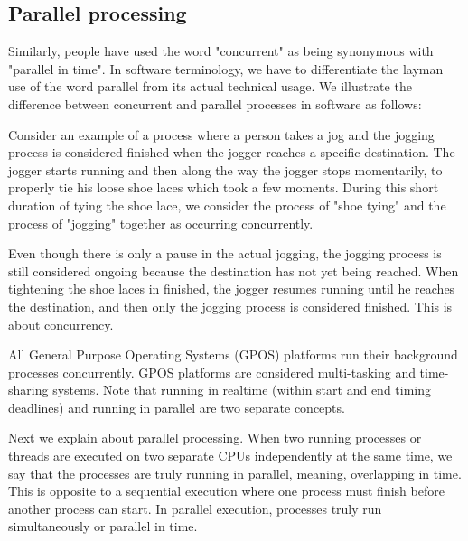 \subsection{Parallel processing}

Similarly, people have used the word "concurrent" as being synonymous with "parallel in time". In software terminology, we have to differentiate the layman use of the word parallel from its actual technical usage. We illustrate the difference between concurrent and parallel processes in software as follows: 
\vspace*{1\baselineskip}

Consider an example of a process where a person takes a jog and the jogging process is considered finished when the jogger reaches a specific destination. The jogger starts running and then along the way the jogger stops momentarily, to properly tie his loose shoe laces which took a few moments. During this short duration of tying the shoe lace, we consider the process of "shoe tying" and the process of "jogging" together as occurring concurrently. 
\vspace*{1\baselineskip}

Even though there is only a pause in the actual jogging, the jogging process is still considered ongoing because the destination has not yet being reached. When tightening the shoe laces in finished, the jogger resumes running until he reaches the destination, and then only the jogging process is considered finished. This is about concurrency. 
\vspace*{1\baselineskip}

All General Purpose Operating Systems (GPOS) platforms run their background processes concurrently. GPOS platforms are considered multi-tasking and time-sharing systems. Note that running in realtime (within start and end timing deadlines) and running in parallel are two separate concepts. 
\vspace*{1\baselineskip}

Next we explain about parallel processing. When two running processes or threads are executed on two separate CPUs independently at the same time, we say that the processes are truly running in parallel, meaning, overlapping in time. This is opposite to a sequential execution where one process must finish before another process can start. In parallel execution, processes truly run simultaneously or parallel in time.   

